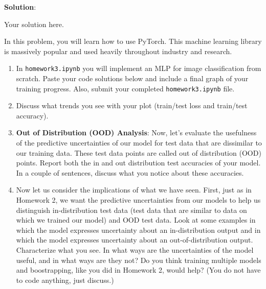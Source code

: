 \documentclass[submit]{../harvardml}
\newenvironment{solution}{
    \vspace{2mm}
    \color{blue}\noindent\textbf{Solution}:
}{}
\begin{document}
\begin{solution}
	Your solution here.
\end{solution}


\newpage


\begin{problem}

In this problem, you will learn how to use PyTorch. This machine learning library is massively popular and used heavily throughout industry and research.


\begin{enumerate}
  \item In \verb|homework3.ipynb| you will implement an MLP for image classification from scratch. Paste your code solutions below and include a final graph of your training progress. Also, submit your completed \verb|homework3.ipynb| file.
  \item Discuss what trends you see with your plot (train/test loss and train/test accuracy).

  \item \textbf{Out of Distribution (OOD) Analysis}: Now, let's evaluate the usefulness of the predictive uncertainties of our model for test data that are dissimilar to our training data. These test data points are called out of distribution (OOD) points. Report both the in and out distribution test accuracies of your model. In a couple of sentences, discuss what you notice about these accuracies.

  \item Now let us consider the implications of what we have seen.  First, just as in Homework 2, we want the predictive uncertainties from our models to help us distinguish in-distribution test data (test data that are similar to data on which we trained our model) and OOD test data.  Look at some examples in which the model expresses uncertainty about an in-distribution output and in which the model expresses uncertainty about an out-of-distribution output.  Characterize what you see.  In what ways are the uncertainties of the model useful, and in what ways are they not?  Do you think training multiple models and boostrapping, like you did in Homework 2, would help?  (You do not have to code anything, just discuss.)


\end{enumerate}
\end{problem}
\end{document}
